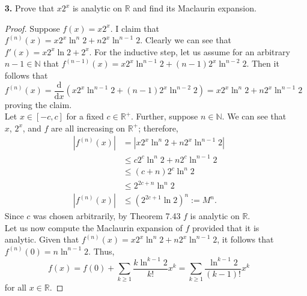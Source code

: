 \documentclass[ 12pt ]{article}
\begin{document}
\begin{enumerate}
\begin{proof}
			Let us now compute the Maclaurin expansion of $\cos$ provided that it is analytic. Notice that \[ \cos^{(n)} x = \begin{cases} \cos x; & n = 4k \\ -\sin x; & n = 4k + 1 \\
			-\cos x; & n = 4k + 2 \\ \sin x; & n = 4k + 3 \end{cases}. \] We can then conclude that $\cos^{(2k)} x = (-1)^k \cos x$ and $\cos^{(2k + 1)} x = (-1)^{k+1} \sin x$ for all
			$k \in \mathbb{N} \cup \{ 0 \}$; then it follows that $\cos^{(2n)} 0 = (-1)^k$ and $\cos^{(2n + 1)} 0 = 0$ illustrating that the odd terms in our Maclaurin expansion will vanish.
			Thus, $$\cos x = \sum_{k \geq 0} \frac{(-1)^k}{(2k)!} x^{2k}$$ for all $x \in \mathbb{R}$.
		\end{proof}


	\item[\textbf{3.}] Prove that $x2^x$ is analytic on $\mathbb{R}$ and find its Maclaurin expansion.

		\begin{proof}
			Suppose $f(x) = x2^x$. I claim that $f^{(n)}(x) = x2^x \ln^n 2 + n 2^x \ln^{n-1} 2$. Clearly we can see that $f'(x) = x2^x \ln 2 + 2^x$. For the inductive step, let us assume
			for an arbitrary $n-1 \in \mathbb{N}$ that $f^{(n-1)}(x) = x2^x \ln^{n-1} 2 + (n-1)2^x \ln^{n-2} 2$. Then it follows that $$f^{(n)}(x) = \frac{\mathrm{d}}{\mathrm{d}x}(x2^x
			\ln^{n-1}2 + (n-1)2^x \ln^{n-2}2) = x2^x \ln^n 2 + n2^x \ln^{n-1}2$$ proving the claim. \\

			Let $x \in [-c, c]$ for a fixed $c \in \mathbb{R}^+$. Further, suppose $n \in \mathbb{N}$. We can see that $x$, $2^x$, and $f$ are all increasing on $\mathbb{R}^+$; therefore,
			\begin{align*}
				|f^{(n)}(x)| &= |x2^x \ln^n 2 + n 2^x \ln^{n-1} 2| \\
				&\leq c2^c \ln^n 2 + n 2^c \ln^{n-1} 2 \\
				&\leq (c + n) 2^c \ln^n 2 \\
				&\leq 2^{2c + n} \ln^n 2 \\
				|f^{(n)}(x)| &\leq ( 2^{2c + 1} \ln 2 )^n := M^n.
			\end{align*}
			Since $c$ was chosen arbitrarily, by Theorem 7.43 $f$ is analytic on $\mathbb{R}$. \\

			Let us now compute the Maclaurin expansion of $f$ provided that it is analytic. Given that $f^{(n)}(x) = x2^x \ln^n 2 + n 2^x \ln^{n-1} 2$, it follows that $f^{(n)}(0) =
			n \ln^{n-1} 2$. Thus, $$f(x) = f(0) + \sum_{k \geq 1} \frac{k \ln^{k-1} 2}{k!}x^k = \sum_{k \geq 1} \frac{\ln^{k-1} 2}{(k-1)!} x^k$$ for all $x \in \mathbb{R}$.
		\end{proof}



\end{enumerate}
\end{document}
